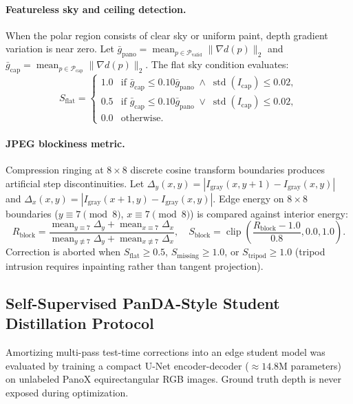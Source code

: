 \documentclass{article}
\begin{document}
\paragraph{Featureless sky and ceiling detection.} When the polar region consists of clear sky or uniform paint, depth gradient variation is near zero. Let $\bar{g}_{\mathrm{pano}} = \operatorname{mean}_{p \in \mathcal{P}_{\mathrm{valid}}} \|\nabla d(p)\|_2$ and $\bar{g}_{\mathrm{cap}} = \operatorname{mean}_{p \in \mathcal{P}_{\mathrm{cap}}} \|\nabla d(p)\|_2$. The flat sky condition evaluates:
\begin{equation}
S_{\mathrm{flat}} = \begin{cases}
1.0 & \text{if } \bar{g}_{\mathrm{cap}} \le 0.10 \bar{g}_{\mathrm{pano}} \;\land\; \operatorname{std}(I_{\mathrm{cap}}) \le 0.02, \\
0.5 & \text{if } \bar{g}_{\mathrm{cap}} \le 0.10 \bar{g}_{\mathrm{pano}} \;\lor\; \operatorname{std}(I_{\mathrm{cap}}) \le 0.02, \\
0.0 & \text{otherwise}.
\end{cases}
\end{equation}

\paragraph{JPEG blockiness metric.} Compression ringing at $8\times 8$ discrete cosine transform boundaries produces artificial step discontinuities. Let $\Delta_y(x,y) = |I_{\mathrm{gray}}(x, y+1) - I_{\mathrm{gray}}(x,y)|$ and $\Delta_x(x,y) = |I_{\mathrm{gray}}(x+1, y) - I_{\mathrm{gray}}(x,y)|$. Edge energy on $8\times 8$ boundaries ($y \equiv 7 \pmod 8$, $x \equiv 7 \pmod 8$) is compared against interior energy:
\begin{equation}
R_{\mathrm{block}} = \frac{\operatorname{mean}_{y \equiv 7} \Delta_y + \operatorname{mean}_{x \equiv 7} \Delta_x}{\operatorname{mean}_{y \not\equiv 7} \Delta_y + \operatorname{mean}_{x \not\equiv 7} \Delta_x}, \quad S_{\mathrm{block}} = \operatorname{clip}\left(\frac{R_{\mathrm{block}} - 1.0}{0.8}, 0.0, 1.0\right).
\end{equation}
Correction is aborted when $S_{\mathrm{flat}} \ge 0.5$, $S_{\mathrm{missing}} \ge 1.0$, or $S_{\mathrm{tripod}} \ge 1.0$ (tripod intrusion requires inpainting rather than tangent projection).

\subsection{Self-Supervised PanDA-Style Student Distillation Protocol}
Amortizing multi-pass test-time corrections into an edge student model was evaluated by training a compact U-Net encoder-decoder ($\approx 14.8\text{M}$ parameters) on unlabeled PanoX equirectangular RGB images. Ground truth depth is never exposed during optimization.
\end{document}
